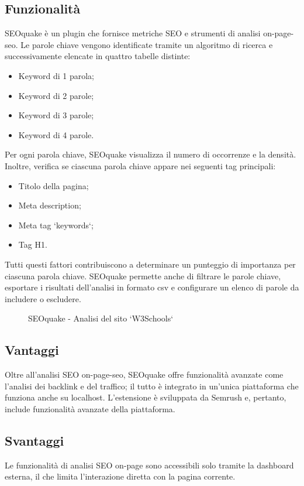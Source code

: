 \subsection{Funzionalità}
\par SEOquake è un plugin che fornisce metriche SEO e strumenti di analisi \gls{on-page-seo}. Le parole chiave vengono identificate tramite un algoritmo di ricerca e successivamente elencate in quattro tabelle distinte:
\begin{itemize}
    \item Keyword di 1 parola;
    \item Keyword di 2 parole;
    \item Keyword di 3 parole;
    \item Keyword di 4 parole.
\end{itemize}
Per ogni parola chiave, SEOquake visualizza il numero di occorrenze e la densità. Inoltre, verifica se ciascuna parola chiave appare nei seguenti tag principali:
\begin{itemize}
    \item Titolo della pagina;
    \item Meta description;
    \item Meta tag `keywords`;
    \item Tag H1.
\end{itemize}
Tutti questi fattori contribuiscono a determinare un punteggio di importanza per ciascuna parola chiave. SEOquake permette anche di filtrare le parole chiave, esportare i risultati dell'analisi in formato \gls{csv} e configurare un elenco di parole da includere o escludere.

\begin{figure}[H]
    \centering 
    \caption{SEOquake - Analisi del sito `W3Schools`}
\end{figure}

\subsection{Vantaggi}
\par Oltre all'analisi SEO \gls{on-page-seo}, SEOquake offre funzionalità avanzate come l'analisi dei \gls{backlink} e del traffico; il tutto è integrato in un'unica piattaforma che funziona anche su \gls{localhost}. L'estensione è sviluppata da Semrush e, pertanto, include funzionalità avanzate della piattaforma.

\subsection{Svantaggi}
\par Le funzionalità di analisi SEO on-page sono accessibili solo tramite la dashboard esterna, il che limita l'interazione diretta con la pagina corrente.

